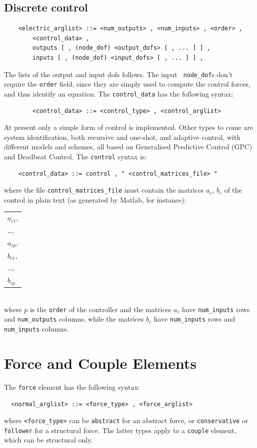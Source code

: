 \documentclass[10pt,dvips]{report}
\begin{document}
\subsection{Discrete control}
  \begin{verbatim}
    <electric_arglist> ::= <num_outputs> , <num_inputs> , <order> ,
        <control_data> , 
        outputs [ , (node_dof) <output_dofs> [ , ... ] ] ,
        inputs [ , (node_dof) <input_dofs> [ , ... ] ] ,
  \end{verbatim}
  The lists of the output and input dofs follows. The input {\tt
  node\_dof}s don't require the {\tt order} field, since they are simply
  used to compute the control forces, and thus identify an equation.
  The {\tt control\_data} has the following syntax:
  \begin{verbatim}  
        <control_data> ::= <control_type> , <control_arglist>
  \end{verbatim}
  At present only a simple form of control is implemented. Other types
  to come are system identification, both recursive and one-shot, and
  adaptive control, with different models and schemes, all based on 
  Generalised Predictive Control (GPC) and Deadbeat Control.
  The {\tt control} syntax is:
  \begin{verbatim}
    <control_data> ::= control , " <control_matrices_file> "
  \end{verbatim}
  where the file {\tt control\_matrices\_file} must contain the matrices
  $ a_c $, $ b_c $ of the control in plain text (as generated by Matlab, for
  instance): \\
  \begin{tabular}{l}
    $ a_{c1} $, \\
    \ldots,     \\
    $ a_{cp} $, \\
    $ b_{c1} $, \\
    \ldots,     \\
    $ b_{cp} $  \\
  \end{tabular} \\
  where $ p $ is the {\tt order} of the controller and the matrices $ a_c $
  have {\tt num\_inputs} rows and {\tt num\_outputs} columns, while the
  matrices $ b_c $ have {\tt num\_inputs} rows and {\tt num\_inputs} columns.





\section{Force and Couple Elements}
The {\tt force} element has the following syntax:
\begin{verbatim}
  <normal_arglist> ::= <force_type> , <force_arglist>
\end{verbatim}
where {\tt <force\_type>} can be {\tt abstract} for an abstract force, or 
{\tt conservative} or {\tt follower} for a structural force. The latter types
apply to a {\tt couple} element, which can be structural only.
\end{document}
